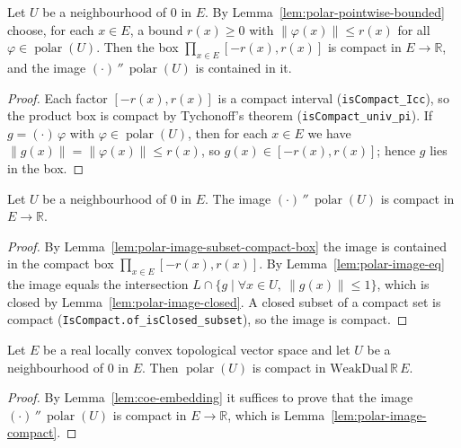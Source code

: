 \begin{lemma}
    \label{lem:polar-image-subset-compact-box}
    Let $U$ be a neighbourhood of $0$ in $E$. By
    Lemma~\ref{lem:polar-pointwise-bounded} choose, for each $x \in E$, a bound
    $r(x) \ge 0$ with $\lVert \varphi(x) \rVert \le r(x)$ for all
    $\varphi \in \operatorname{polar}(U)$. Then the box
    $\prod_{x \in E} [-r(x), r(x)]$ is compact in $E \to \mathbb{R}$, and the
    image $(\cdot)\,''\,\operatorname{polar}(U)$ is contained in it.
\end{lemma}
\begin{proof}
    Each factor $[-r(x), r(x)]$ is a compact interval
    (\texttt{isCompact\_Icc}), so the product box is compact by Tychonoff's
    theorem (\texttt{isCompact\_univ\_pi}). If $g = (\cdot)\,\varphi$ with
    $\varphi \in \operatorname{polar}(U)$, then for each $x \in E$ we have
    $\lVert g(x) \rVert = \lVert \varphi(x) \rVert \le r(x)$, so
    $g(x) \in [-r(x), r(x)]$; hence $g$ lies in the box.
\end{proof}

\begin{lemma}
    \label{lem:polar-image-compact}
    Let $U$ be a neighbourhood of $0$ in $E$. The image
    $(\cdot)\,''\,\operatorname{polar}(U)$ is compact in $E \to \mathbb{R}$.
\end{lemma}
\begin{proof}
    By Lemma~\ref{lem:polar-image-subset-compact-box} the image is contained in
    the compact box $\prod_{x \in E} [-r(x), r(x)]$. By
    Lemma~\ref{lem:polar-image-eq} the image equals the intersection
    $L \cap \{ g \mid \forall x \in U,\ \lVert g(x) \rVert \le 1 \}$, which is
    closed by Lemma~\ref{lem:polar-image-closed}. A closed subset of a compact
    set is compact (\texttt{IsCompact.of\_isClosed\_subset}), so the image is
    compact.
\end{proof}

\begin{theorem}
    \label{thm:banach-alaoglu-bourbaki}
    Let $E$ be a real locally convex topological vector space and let $U$ be a
    neighbourhood of $0$ in $E$. Then $\operatorname{polar}(U)$ is compact in
    $\mathrm{WeakDual}\,\mathbb{R}\,E$.
\end{theorem}
\begin{proof}
    By Lemma~\ref{lem:coe-embedding} it suffices to prove that the image
    $(\cdot)\,''\,\operatorname{polar}(U)$ is compact in $E \to \mathbb{R}$,
    which is Lemma~\ref{lem:polar-image-compact}.
\end{proof}
